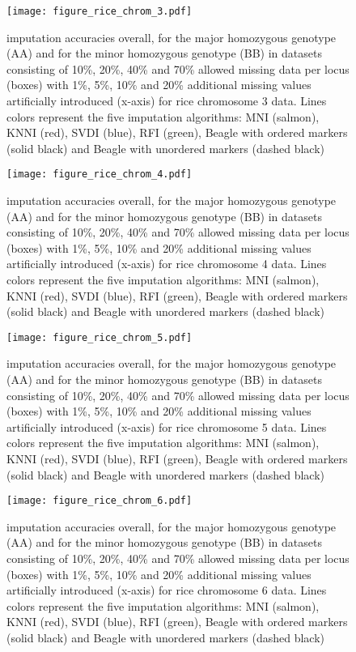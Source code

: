 \begin{figure}\texttt{[image: figure\_rice\_chrom\_3.pdf]}\caption{
imputation accuracies overall, for the major homozygous genotype (AA) and for the minor homozygous genotype (BB) in datasets consisting of
10\%, 20\%, 40\% and 70\% allowed missing data per locus (boxes) with 1\%, 5\%, 10\% and 20\%
additional missing values artificially introduced (x-axis) for rice chromosome 3 data.
Lines colors represent the five imputation algorithms: MNI (salmon), KNNI (red), SVDI (blue), RFI (green), Beagle with ordered markers (solid black) and Beagle with unordered markers (dashed black)}\end{figure}

\begin{figure}\texttt{[image: figure\_rice\_chrom\_4.pdf]}\caption{
imputation accuracies overall, for the major homozygous genotype (AA) and for the minor homozygous genotype (BB) in datasets consisting of
10\%, 20\%, 40\% and 70\% allowed missing data per locus (boxes) with 1\%, 5\%, 10\% and 20\%
additional missing values artificially introduced (x-axis) for rice chromosome 4 data.
Lines colors represent the five imputation algorithms: MNI (salmon), KNNI (red), SVDI (blue), RFI (green), Beagle with ordered markers (solid black) and Beagle with unordered markers (dashed black)}\end{figure}

\begin{figure}\texttt{[image: figure\_rice\_chrom\_5.pdf]}\caption{
imputation accuracies overall, for the major homozygous genotype (AA) and for the minor homozygous genotype (BB) in datasets consisting of
10\%, 20\%, 40\% and 70\% allowed missing data per locus (boxes) with 1\%, 5\%, 10\% and 20\%
additional missing values artificially introduced (x-axis) for rice chromosome 5 data.
Lines colors represent the five imputation algorithms: MNI (salmon), KNNI (red), SVDI (blue), RFI (green), Beagle with ordered markers (solid black) and Beagle with unordered markers (dashed black)}\end{figure}

\begin{figure}\texttt{[image: figure\_rice\_chrom\_6.pdf]}\caption{
imputation accuracies overall, for the major homozygous genotype (AA) and for the minor homozygous genotype (BB) in datasets consisting of
10\%, 20\%, 40\% and 70\% allowed missing data per locus (boxes) with 1\%, 5\%, 10\% and 20\%
additional missing values artificially introduced (x-axis) for rice chromosome 6 data.
Lines colors represent the five imputation algorithms: MNI (salmon), KNNI (red), SVDI (blue), RFI (green), Beagle with ordered markers (solid black) and Beagle with unordered markers (dashed black)}\end{figure}

